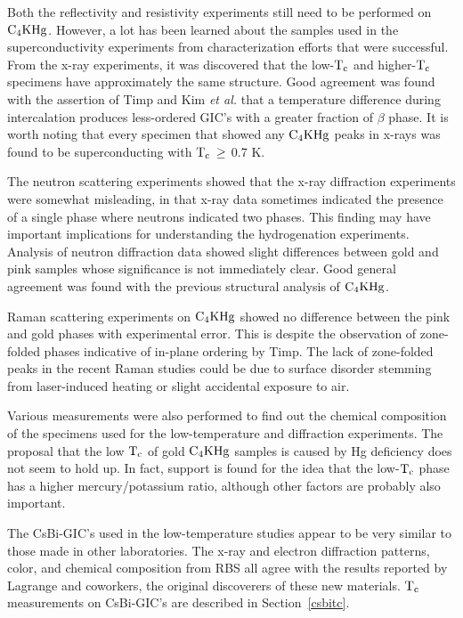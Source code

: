         Both the reflectivity and resistivity experiments still  need to be
performed on $\rm  C_4KHg$.   However,  a lot has   been learned about  the
samples used in  the   superconductivity experiments  from characterization
efforts that  were successful.  From the x-ray experiments, it
was discovered that the low-$\rm  T_c$ and higher-$\rm  T_c$ specimens have
approximately  the same structure.    Good   agreement  was found with  the
assertion  of Timp\cite{J140} and Kim {\em   et  al.\/}\cite{kim84}  that a
temperature difference  during  intercalation  produces less-ordered  GIC's
with  a greater fraction  of $\beta$ phase.   It is worth noting that every
specimen  that showed any  $\rm C_4KHg$  peaks  in x-rays  was found  to be
superconducting with $\rm T_c \: \geq$ 0.7 K.  
        
        The neutron  scattering    experiments   showed   that   the  x-ray
diffraction experiments   were  somewhat  misleading,  in  that  x-ray data
sometimes indicated the presence of a single phase where neutrons indicated
two phases.  This finding may have important implications for understanding
the hydrogenation experiments.  Analysis of neutron diffraction data showed
slight differences between gold and  pink samples whose significance is not
immediately   clear.   Good general  agreement  was   found with   the previous
structural   analysis   of $\rm  C_4KHg$.\cite{yang84}

            Raman  scattering  experiments  on  $\rm   C_4KHg$   showed  no
difference between the pink and gold phases with experimental  error.  This
is  despite the  observation of  zone-folded phases  indicative of in-plane
ordering by Timp.\cite{N128} The lack  of  zone-folded peaks  in the recent
Raman studies could be due to surface disorder stemming  from laser-induced
heating or slight accidental exposure to air.

        Various measurements were also  performed to find  out the chemical
composition of the  specimens used for  the low-temperature and diffraction
experiments.  The proposal  that the low $\rm  T_c$ of  gold  $\rm  C_4KHg$
samples is caused by Hg deficiency\cite{H242} does not seem to hold up.  In
fact, support is found for  the idea that  the low-$\rm  T_c$  phase has  a
higher mercury/potassium   ratio,\cite{yang84} although other   factors are
probably also important.

        The  CsBi-GIC's  used in  the low-temperature  studies appear to be
very   similar  to  those made  in   other  laboratories.   The  x-ray  and
electron\cite{speck88z} diffraction    patterns,   color,    and   chemical
composition from RBS  all agree with the  results reported  by Lagrange and
coworkers,\cite{lagrange87}   the  original    discoverers  of   these  new
materials.   $\rm   T_c$  measurements  on   CsBi-GIC's are   described  in
Section~\ref{csbitc}.


